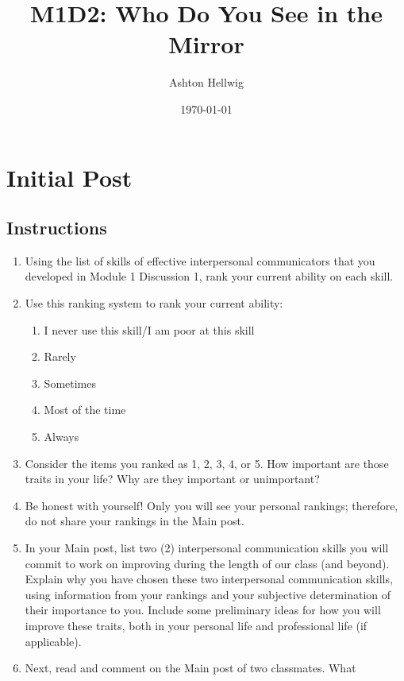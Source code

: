 \documentclass[stu,12pt]{apa7}
\title{%
    M1D2: Who Do You See in the Mirror
  }
\author{Ashton Hellwig}
\date{\today}
\begin{document}
  \maketitle

  \section{Initial Post}
    \subsection*{Instructions}
      \begin{enumerate}
        \item Using the list of skills of effective interpersonal communicators
          that you developed in Module 1 Discussion 1, rank your current ability
          on each skill.
        \item Use this ranking system to rank your current ability:
          \begin{enumerate}
            \item I never use this skill/I am poor at this skill
            \item Rarely
            \item Sometimes
            \item Most of the time
            \item Always
          \end{enumerate}
        \item Consider the items you ranked as 1, 2, 3, 4, or 5. How important
          are those traits in your life? Why are they important or unimportant?
        \item Be honest with yourself! Only you will see your personal rankings;
          therefore, do not share your rankings in the Main post.
        \item In your Main post, list two (2) interpersonal communication skills
          you will commit to work on improving during the length of our class
          (and beyond). Explain why you have chosen these two interpersonal
          communication skills, using information from your rankings and your
          subjective determination of their importance to you. Include some
          preliminary ideas for how you will improve these traits, both in your
          personal life and professional life (if applicable).
        \item Next, read and comment on the Main post of two classmates. What

\end{enumerate}
\end{document}
